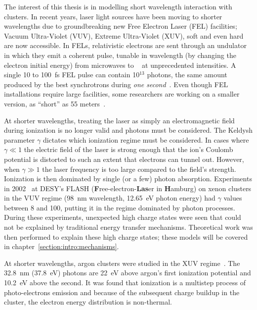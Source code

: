 The interest of this thesis is in modelling short wavelength interaction with
clusters. In recent years, laser light sources have been moving to shorter
wavelengths due to groundbreaking new Free Electron Laser (FEL)
facilities; Vacuum Ultra-Violet (VUV), Extreme Ultra-Violet (XUV), soft \xrays
and even hard \xrays are now accessible. In FELs, relativistic electrons are sent
through an undulator in which they emit a coherent pulse, tunable in wavelength
(by changing the electron initial energy)
from microwaves to \xrays~\cite{Brabec2009,Ackermann2007a,Pellegrini2012} at
unprecedented intensities. A single 10 to 100~fs FEL pulse can contain 10$^{13}$
photons, the same amount produced by the best synchrotrons during
\textit{one second}~\cite{Bostedt2009}. Even though FEL installations require
large facilities, some researchers are working on a smaller version, as
``short'' as 55 meters~\cite{Shintake2008}.

At shorter wavelengths, treating the laser as simply an electromagnetic field
during ionization is no longer valid and photons must be considered.
The Keldysh parameter $\gamma$ dictates which ionization regime must be considered. In
cases where $\gamma \ll 1$ the electric field of the laser is strong enough that
the ion's Coulomb potential is distorted to such an extent
that electrons can tunnel out.
However, when $\gamma \gg 1$ the laser frequency is too large compared to the
field's strength. Ionization is then dominated by single (or a few) photon
absorption.
Experiments in
2002~\cite{Wabnitz2002,Bostedt2009} at
DESY's FLASH (\textbf{F}ree-electron-\textbf{Las}er in \textbf{H}amburg)
on xenon clusters in the VUV regime (98~nm wavelength, 12.65~eV photon energy)
had $\gamma$ values between 8 and
100, putting it in the regime dominated by photon processes.
During these experiments, unexpected high charge states were seen that could not
be explained by traditional energy transfer mechanisms. Theoretical work was
then performed to explain these high charge states; these models will be
covered in chapter~\ref{section:intro:mechanisms}.



At shorter wavelengths,
argon clusters were studied in the XUV regime~\cite{Bostedt2008}. The 32.8~nm
(37.8~eV) photons are 22~eV above argon's first ionization
potential and 10.2~eV  above the second. It was found that ionization is a multistep process of
photo-electrons emission and because of the subsequent charge buildup in the
cluster, the electron energy distribution is non-thermal.

